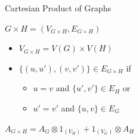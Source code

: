 \documentclass{beamer}
\begin{document}
\begin{frame}[t]{Cartesian Product of Graphs}
	\begin{exampleblock}{}
	\setlength\abovedisplayskip{-8pt}
	\begin{center}
		$G \times H = (V_{G\times H},E_{G\times H})$
	\end{center}
	\end{exampleblock}
	\begin{itemize}
		\item $V_{G\times H} = V(G) \times V(H)$
		\item $\{(u,u'),(v,v')\} \in E_{G\times H}$ if 
		\begin{itemize}
			\item $u = v$ and $\{u',v'\} \in E_H$ or
			\item $u' = v'$ and $\{u,v\} \in E_G$
		\end{itemize}
	\end{itemize}
	\begin{exampleblock}{}
	\setlength\abovedisplayskip{-8pt}
	\begin{center}
		$A_{G\times H} = A_G \otimes \text{1}_{(V_H)} + \text{1}_{(V_G)} \otimes A_H$
	\end{center}
	\end{exampleblock}
\end{frame}
\end{document}
